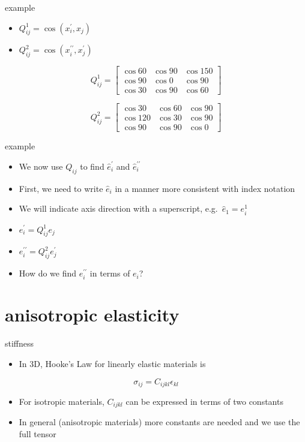 \documentclass[
  letterpaper,
  ignorenonframetext,
  aspectratio=43,
  handout,
  12pt]{beamer}
\providecommand{\tightlist}{%
  \setlength{\itemsep}{0pt}\setlength{\parskip}{0pt}}
\providecommand{\tightlist}{%
\setlength{\itemsep}{0pt}\setlength{\parskip}{0pt}}
\begin{document}
\begin{frame}{example}
\protect\hypertarget{example-3}{}
\begin{itemize}
\tightlist
\item
  \(Q_{ij}^1 = \cos(x_i^\prime,x_j)\)
\item
  \(Q_{ij}^2 = \cos(x_i^{\prime\prime},x_j^\prime)\)
\end{itemize}

\[Q_{ij}^1 = \begin{bmatrix}
  \cos 60 & \cos 90 & \cos 150\\
  \cos 90 & \cos 0 & \cos 90\\
  \cos 30 & \cos 90 & \cos 60
\end{bmatrix}\]

\[Q_{ij}^2 = \begin{bmatrix}
  \cos 30 & \cos 60 & \cos 90\\
  \cos 120 & \cos 30 & \cos 90\\
  \cos 90 & \cos 90 & \cos 0
\end{bmatrix}\]
\end{frame}

\begin{frame}{example}
\protect\hypertarget{example-4}{}
\begin{itemize}
\tightlist
\item
  We now use \(Q_{ij}\) to find \(\hat{e}_i^\prime\) and
  \(\hat{e}_i^{\prime \prime}\)
\item
  First, we need to write \(\hat{e}_i\) in a manner more consistent with
  index notation
\item
  We will indicate axis direction with a superscript,
  e.g.~\(\hat{e}_1 = e_i^1\)
\item
  \(e_i^\prime = Q_{ij}^1 e_j\)
\item
  \(e_i^{\prime\prime} = Q_{ij}^2 e_j^\prime\)
\item
  How do we find \(e_i^{\prime\prime}\) in terms of \(e_i\)?
\end{itemize}
\end{frame}

\hypertarget{anisotropic-elasticity}{%
\section{anisotropic elasticity}\label{anisotropic-elasticity}}

\begin{frame}{stiffness}
\protect\hypertarget{stiffness}{}
\begin{itemize}
\tightlist
\item
  In 3D, Hooke's Law for linearly elastic materials is
\end{itemize}

\[\sigma_{ij} = C_{ijkl} \epsilon_{kl}\]

\begin{itemize}
\tightlist
\item
  For isotropic materials, \(C_{ijkl}\) can be expressed in terms of two
  constants
\item
  In general (anisotropic materials) more constants are needed and we
  use the full tensor
\end{itemize}
\end{frame}
\end{document}
